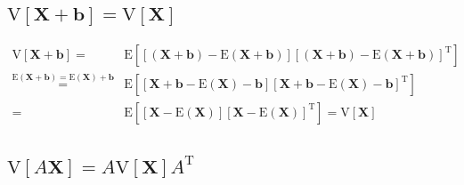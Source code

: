 \documentclass[
]{book}
\theoremstyle{definition}
\theoremstyle{definition}
\theoremstyle{definition}
\theoremstyle{definition}
\theoremstyle{remark}
\begin{document}
\subsection{\texorpdfstring{\(\mathrm{V}\left[\boldsymbol{X}+\boldsymbol{b}\right]=\mathrm{V}\left[\boldsymbol{X}\right]\)}{\textbackslash mathrm\{V\}\textbackslash left{[}\textbackslash boldsymbol\{X\}+\textbackslash boldsymbol\{b\}\textbackslash right{]}=\textbackslash mathrm\{V\}\textbackslash left{[}\textbackslash boldsymbol\{X\}\textbackslash right{]}}}\label{mathrmvleftboldsymbolxboldsymbolbrightmathrmvleftboldsymbolxright}

\begin{align*}
\mathrm{V}\left[\boldsymbol{X}+\boldsymbol{b}\right]= & \mathrm{E}\left[\left[\left(\boldsymbol{X}+\boldsymbol{b}\right)-\mathrm{E}\left(\boldsymbol{X}+\boldsymbol{b}\right)\right]\left[\left(\boldsymbol{X}+\boldsymbol{b}\right)-\mathrm{E}\left(\boldsymbol{X}+\boldsymbol{b}\right)\right]^{\mathrm{T}}\right]\\
\overset{\mathrm{E}\left(\boldsymbol{X}+\boldsymbol{b}\right)=\mathrm{E}\left(\boldsymbol{X}\right)+\boldsymbol{b}}{=} & \mathrm{E}\left[\left[\boldsymbol{X}+\boldsymbol{b}-\mathrm{E}\left(\boldsymbol{X}\right)-\boldsymbol{b}\right]\left[\boldsymbol{X}+\boldsymbol{b}-\mathrm{E}\left(\boldsymbol{X}\right)-\boldsymbol{b}\right]^{\mathrm{T}}\right]\\
= & \mathrm{E}\left[\left[\boldsymbol{X}-\mathrm{E}\left(\boldsymbol{X}\right)\right]\left[\boldsymbol{X}-\mathrm{E}\left(\boldsymbol{X}\right)\right]^{\mathrm{T}}\right]=\mathrm{V}\left[\boldsymbol{X}\right]
\end{align*}

\subsection{\texorpdfstring{\(\mathrm{V}\left[A\boldsymbol{X}\right]=A\mathrm{V}\left[\boldsymbol{X}\right]A^{\mathrm{T}}\)}{\textbackslash mathrm\{V\}\textbackslash left{[}A\textbackslash boldsymbol\{X\}\textbackslash right{]}=A\textbackslash mathrm\{V\}\textbackslash left{[}\textbackslash boldsymbol\{X\}\textbackslash right{]}A\^{}\{\textbackslash mathrm\{T\}\}}}\label{mathrmvleftaboldsymbolxrightamathrmvleftboldsymbolxrightamathrmt}
\end{document}
